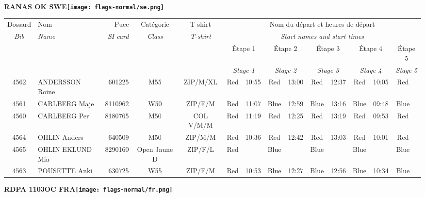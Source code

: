 \documentclass{report}
\begin{document}
\newpage
  \Huge \centering \bfseries RANAS OK  SWE\normalfont \footnotesize \sffamily \hfill \texttt{[image: flags-normal/se.png]} \newline 
  \begin{longtable}{|c|l|r|c|c|*{5}{cc|}}
    Dossard & Nom  & Puce    & Catégorie & T-shirt & \multicolumn{10}{c|}{Nom du départ et heures de départ} \\
    \itshape Bib     & \itshape Name & \itshape SI card & \itshape Class  & \itshape  T-shirt  & \multicolumn{10}{c|}{\itshape Start names and start times} \\
    \hline
    & & & & & \multicolumn{2}{c|}{Étape 1} & \multicolumn{2}{c|}{Étape 2} & \multicolumn{2}{c|}{Étape 3} & \multicolumn{2}{c|}{Étape 4} & \multicolumn{2}{c|}{Étape 5} \\
    & & & & & \multicolumn{2}{c|}{\itshape Stage 1} & \multicolumn{2}{c|}{\itshape Stage 2} & \multicolumn{2}{c|}{\itshape Stage 3} & \multicolumn{2}{c|}{\itshape Stage 4} & \multicolumn{2}{c|}{\itshape Stage 5} \\
    \hline
    4562 & ANDERSSON Roine & 601225 & M55 & ZIP/M/XL & Red & 10:55 & Red & 13:00 & Red & 12:37 & Red & 10:05 & Red &  \\
    4561 & CARLBERG Maje & 8110962 & W50 & ZIP/F/M & Red & 11:07 & Blue & 12:59 & Blue & 13:16 & Blue & 09:48 & Blue &  \\
    4560 & CARLBERG Per & 8180765 & M50 & COL V/M/M & Red & 11:19 & Red & 12:25 & Red & 13:19 & Red & 09:53 & Red &  \\
    4564 & OHLIN Anders & 640509 & M50 & ZIP/M/M & Red & 10:36 & Red & 12:42 & Red & 13:03 & Red & 10:01 & Red &  \\
    4565 & OHLIN EKLUND Mia & 8290160 & Open Jaune D & ZIP/F/L & Red &   & Blue &   & Blue &   & Blue &   & Blue &  \\
    4563 & POUSETTE Anki & 630725 & W55 & ZIP/F/M & Red & 10:53 & Blue & 12:27 & Blue & 12:56 & Blue & 10:34 & Blue &  \\
  \end{longtable}
\newpage
  \Huge \centering \bfseries RDPA 1103OC FRA\normalfont \footnotesize \sffamily \hfill \texttt{[image: flags-normal/fr.png]} \newline 
\end{document}
